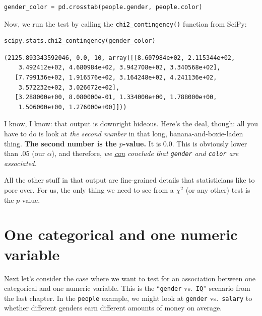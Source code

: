 \begin{Verbatim}[fontsize=\small,samepage=true,frame=single,framesep=3mm]
gender_color = pd.crosstab(people.gender, people.color)
\end{Verbatim}

Now, we run the test by calling the \texttt{chi2\_contingency()} function from
SciPy:

\begin{Verbatim}[fontsize=\footnotesize,samepage=true,frame=single,framesep=3mm]
scipy.stats.chi2_contingency(gender_color)
\end{Verbatim}
\vspace{-.2in}

\begin{Verbatim}[fontsize=\small,samepage=true,frame=leftline,framesep=5mm,framerule=1mm]
(2125.893343592046, 0.0, 10, array([[8.607984e+02, 2.115344e+02, 
    3.492412e+02, 4.680984e+02, 3.942708e+02, 3.340568e+02],
   [7.799136e+02, 1.916576e+02, 3.164248e+02, 4.241136e+02, 
    3.572232e+02, 3.026672e+02],
   [3.288000e+00, 8.080000e-01, 1.334000e+00, 1.788000e+00, 
    1.506000e+00, 1.276000e+00]]))
\end{Verbatim}


I know, I know: that output is downright hideous. Here's the deal, though: all
you have to do is look at \textit{the second number} in that long,
banana-and-boxie-laden thing. \textbf{The second number is the $p$-value.} It is
0.0. This is obviously lower than .05 (our $\alpha$), and therefore, \textit{we
\underline{can} conclude that \texttt{gender} and \texttt{color} are
associated.}

All the other stuff in that output are fine-grained details that statisticians
like to pore over. For us, the only thing we need to see from a $\chi^2$ (or
any other) test is the $p$-value.

\section{One categorical and one numeric variable}

Next let's consider the case where we want to test for an association between
one categorical and one numeric variable. This is the ``\texttt{gender}
vs.~\texttt{IQ}'' scenario from the last chapter. In the \texttt{people}
example, we might look at \texttt{gender} vs.~\texttt{salary} to whether
different genders earn different amounts of money on average.

